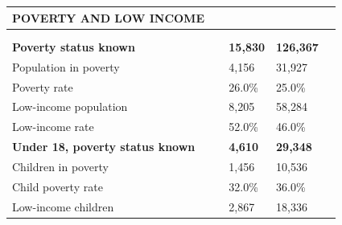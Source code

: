 \documentclass[9pt]{report}
\begin{document}
\vspace{12pt}
\setlength{\tabcolsep}{.01in} %
\begin{tabular}{p{.10in}p{.10in}p{.10in}p{3.7in}>{\hfill}p{.85in}>{\hfill}p{.85in}>{\hfill}p{.85in}>{\hfill}p{.85in}p{0.1in}}
\multicolumn{9}{l}{\parbox{7.1in}{\raggedright{\large{\strut\textbf{POVERTY AND LOW INCOME}\strut}}}} \\ 
\hline
\multicolumn{4}{l}{\parbox{3.5in}{\raggedright{\textbf{}}}} & \multicolumn{1}{r}{\parbox{.85in}{\strut\raggedleft{\textbf{}\strut}}} & \multicolumn{1}{r}{\parbox{.85in}{\strut\raggedleft{\textbf{}\strut}}} & \multicolumn{1}{r}{\parbox{.85in}{\strut{}}} & \multicolumn{1}{r}{\parbox{.85in}{\strut{}}} & \\ 
\multicolumn{9}{l}{} \\ 
\multicolumn{4}{l}{\parbox{3.5in}{\strut\raggedright{\textbf{Poverty status known}\strut}}} & \textbf{} & \textbf{} & \textbf{15,830} & \textbf{126,367} & \textbf{} \\ 
\multicolumn{4}{l}{\parbox{3.6in}{\strut\raggedright{{Population in poverty}}\strut}} &  &  & 4,156 & 31,927 & \multicolumn{1}{l}{}  \\ 
\multicolumn{4}{l}{\parbox{3.6in}{\strut\raggedright{{Poverty rate}}\strut}} &  &  & 26.0\% & 25.0\% & \multicolumn{1}{l}{}  \\ 
\multicolumn{4}{l}{\parbox{3.6in}{\strut\raggedright{{Low-income population}}\strut}} &  &  & 8,205 & 58,284 & \multicolumn{1}{l}{}  \\ 
\multicolumn{4}{l}{\parbox{3.6in}{\strut\raggedright{{Low-income rate}}\strut}} &  &  & 52.0\% & 46.0\% & \multicolumn{1}{l}{}  \\ 
\multicolumn{4}{l}{\parbox{3.5in}{\strut\raggedright{\textbf{Under 18, poverty status known}\strut}}} & \textbf{} & \textbf{} & \textbf{4,610} & \textbf{29,348} & \textbf{} \\ 
\multicolumn{4}{l}{\parbox{3.6in}{\strut\raggedright{{Children in poverty}}\strut}} &  &  & 1,456 & 10,536 & \multicolumn{1}{l}{}  \\ 
\multicolumn{4}{l}{\parbox{3.6in}{\strut\raggedright{{Child poverty rate}}\strut}} &  &  & 32.0\% & 36.0\% & \multicolumn{1}{l}{}  \\ 
\multicolumn{4}{l}{\parbox{3.6in}{\strut\raggedright{{Low-income children}}\strut}} &  &  & 2,867 & 18,336 & \multicolumn{1}{l}{}  \\ 

\end{tabular}
\end{document}
